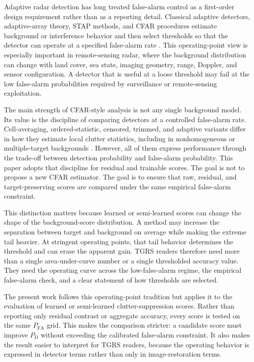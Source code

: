 \documentclass[journal]{IEEEtran}
\begin{document}
Adaptive radar detection has long treated false-alarm control as a first-order design requirement rather than as a reporting detail. Classical adaptive detectors, adaptive-array theory, STAP methods, and CFAR procedures estimate background or interference behavior and then select thresholds so that the detector can operate at a specified false-alarm rate \cite{reed1974adaptive,melvin2004stap,melvin2014stap,rohling1983cfar,kelly1986adaptive,gandhi1988cfar}. This operating-point view is especially important in remote-sensing radar, where the background distribution can change with land cover, sea state, imaging geometry, range, Doppler, and sensor configuration. A detector that is useful at a loose threshold may fail at the low false-alarm probabilities required by surveillance or remote-sensing exploitation.

The main strength of CFAR-style analysis is not any single background model. Its value is the discipline of comparing detectors at a controlled false-alarm rate. Cell-averaging, ordered-statistic, censored, trimmed, and adaptive variants differ in how they estimate local clutter statistics, including in nonhomogeneous or multiple-target backgrounds \cite{rohling1983cfar,gandhi1988cfar}. However, all of them express performance through the trade-off between detection probability and false-alarm probability. This paper adopts that discipline for residual and trainable scores. The goal is not to propose a new CFAR estimator. The goal is to ensure that raw, residual, and target-preserving scores are compared under the same empirical false-alarm constraint.

This distinction matters because learned or semi-learned scores can change the shape of the background-score distribution. A method may increase the separation between target and background on average while making the extreme tail heavier. At stringent operating points, that tail behavior determines the threshold and can erase the apparent gain. TGRS readers therefore need more than a single area-under-curve number or a single thresholded accuracy value. They need the operating curve across the low-false-alarm regime, the empirical false-alarm check, and a clear statement of how thresholds are selected.

The present work follows this operating-point tradition but applies it to the evaluation of learned or semi-learned clutter-suppression scores. Rather than reporting only residual contrast or aggregate accuracy, every score is tested on the same $P_{\mathrm{FA}}$ grid. This makes the comparison stricter: a candidate score must improve $P_{\mathrm{D}}$ without exceeding the calibrated false-alarm constraint. It also makes the result easier to interpret for TGRS readers, because the operating behavior is expressed in detector terms rather than only in image-restoration terms.
\end{document}
